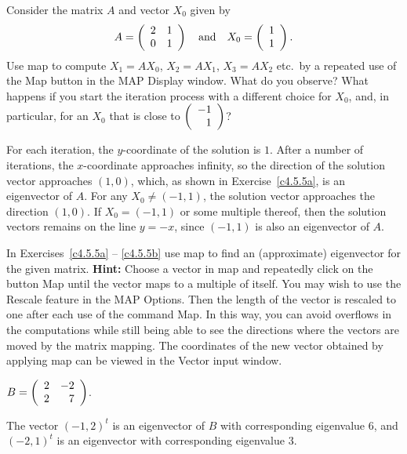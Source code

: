 \documentclass{ximera}
\begin{document}
\begin{computerExercise} \label{c4.5.6}
Consider the matrix $A$ and vector $X_0$ given by
\[
A=\left(\begin{array}{rr} 2 & 1\\ 0 &1\end{array}\right)\quad\mbox{and}\quad X_0=\left(\begin{array}{r} 1 \\ 1\end{array}\right).
\]
Use {\sf map} to compute $X_1 = AX_0$, $X_2 = AX_1$, $X_3=AX_2$ etc.\ by a
repeated use of the {\sf Map} button in the {\sf MAP Display} window.  What
do you observe?  What happens if you start the iteration process with a
different choice for $X_0$, and, in particular, for an $X_0$ that is close
to $\left(\begin{array}{r} -1 \\ 1\end{array}\right)$?

\begin{solution}

For each iteration, the $y$-coordinate of the solution is $1$.  After a
number of iterations, the $x$-coordinate approaches infinity, so the
direction of the solution vector approaches $(1,0)$, which, as shown
in Exercise~\ref{c4.5.5a}, is an eigenvector of $A$.  For any $X_0
\neq (-1,1)$, the solution vector approaches the direction
$(1,0)$.  If $X_0 = (-1,1)$ or some multiple thereof, then the solution
vectors remains on the line $y = -x$, since $(-1,1)$ is also an
eigenvector of $A$.

\end{solution}
\end{computerExercise}

\noindent In Exercises~\ref{c4.5.5a} -- \ref{c4.5.5b} use {\sf map} to find
an (approximate) eigenvector for the given matrix.  {\bf Hint:} Choose a
vector in {\sf map} and repeatedly click on the button {\sf Map} until the
vector maps to a multiple of itself.  You may wish to use the {\sf Rescale} 
feature in the {\sf MAP Options}.  Then the length of the vector is rescaled 
to one after each use of the command {\sf Map}. In this way, you can avoid
overflows in the computations while still being able to see the
directions where the vectors are moved by the matrix mapping.  The coordinates 
of the new vector obtained by applying {\sf map} can be viewed in the 
{\sf Vector input} window.

\begin{computerExercise} \label{c4.5.5a}
$B=\left(\begin{array}{rr} 2 & -2\\ 2 &7\end{array}\right)$.

\begin{solution}
The vector $(-1,2)^t$ is an eigenvector of $B$ with
corresponding eigenvalue $6$, and $(-2,1)^t$ is an eigenvector with
corresponding eigenvalue $3$.


\end{solution}
\end{computerExercise}
\end{document}
